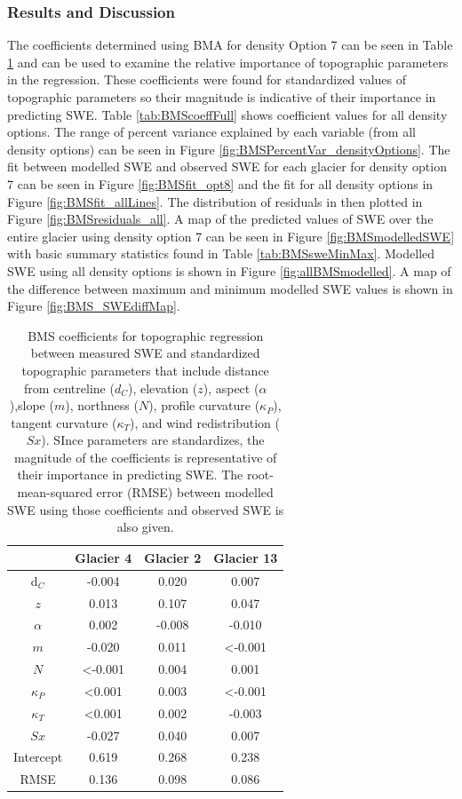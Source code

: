 \documentclass[12pt]{article}
\begin{document}
\subsubsection{Results and Discussion}

The coefficients determined using BMA for density Option 7 can be seen in Table \ref{tab:BMScoeff} and can be used to examine the relative importance of topographic parameters in the regression. These coefficients were found for standardized values of topographic parameters so their magnitude is indicative of their importance in predicting SWE. Table \ref{tab:BMScoeffFull} shows coefficient values for all density options. The range of percent variance explained by each variable (from all density options) can be seen in Figure \ref{fig:BMSPercentVar_densityOptions}. The fit between modelled SWE and observed SWE for each glacier for density option 7 can be seen in Figure \ref{fig:BMSfit_opt8} and the fit for all density options in Figure \ref{fig:BMSfit_allLines}. The distribution of residuals in then plotted in Figure \ref{fig:BMSresiduals_all}. A map of the predicted values of SWE over the entire glacier using density option 7 can be seen in Figure \ref{fig:BMSmodelledSWE} with basic summary statistics found in Table \ref{tab:BMSsweMinMax}. Modelled SWE using all density options is shown in Figure \ref{fig:allBMSmodelled}. A map of the difference between maximum and minimum modelled SWE values is shown in Figure \ref{fig:BMS_SWEdiffMap}.

\begin{table}
\centering
\caption{BMS coefficients for topographic regression between measured SWE and standardized topographic parameters that include distance from centreline ($d_C$), elevation ($z$), aspect ($\alpha$),slope ($m$), northness ($N$), profile curvature ($\kappa_P$), tangent curvature ($\kappa_T$), and wind redistribution ($Sx$). SInce parameters are standardizes, the magnitude of the coefficients is representative of their importance in predicting SWE. The root-mean-squared error (RMSE) between modelled SWE using those coefficients and observed SWE is also given.}
\label{tab:BMScoeff}
\begin{tabular}{cccc}
 & \textbf{Glacier 4} & \textbf{Glacier 2} & \textbf{Glacier 13} \\ \hline
d$_C$ 			& -0.004 					& 0.020 	& 0.007 \\
$z$ 				&  0.013 					& 0.107 	& 0.047 \\
$\alpha$ 		& 0.002 					& -0.008 	& -0.010 \\
$m$ 			& -0.020 					& 0.011 	&  \textless-0.001 \\
$N$ 				&   \textless-0.001 	& 0.004 	& 0.001 \\
$\kappa_P$ 	&  \textless0.001 	& 0.003 	&\textless -0.001 \\
$\kappa_T$ 	& \textless0.001 		& 0.002 	& -0.003 \\
$Sx$ 			& -0.027 					& 0.040 	& 0.007 \\
Intercept 		& 0.619 					& 0.268 	& 0.238 \\ \hline
RMSE 			& 0.136 					& 0.098	& 0.086 
\end{tabular}
\end{table}
\end{document}
